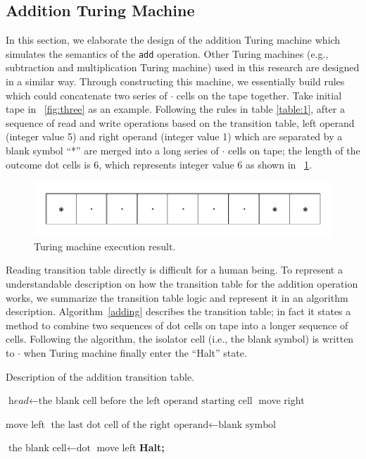\subsection{Addition Turing Machine}
In this section, we elaborate the design of the addition Turing machine which
simulates the semantics of the \texttt{add} operation. Other Turing machines
(e.g., subtraction and multiplication Turing machine) used in this research are
designed in a similar way. Through constructing this machine, we essentially
build rules which could concatenate two series of  $\cdot$ cells on the tape
together. Take initial tape in \F~\ref{fig:three} as an example. Following the
rules in table \ref{table:1}, after a sequence of read and write operations
based on the transition table, left operand (integer value 5) and right operand
(integer value 1) which are separated by a blank symbol ``*'' are merged into a
long series of $\cdot$ cells on tape; the length of the outcome dot cells is 6,
which represents integer value 6 as shown in \F~\ref{fig:turing_outcome}.

\begin{figure}
 \includegraphics[width=0.9\linewidth]{Turingaddoutcome.pdf}
 \caption{Turing machine execution result.}
 \label{fig:turing_outcome}
\end{figure}

Reading transition table directly is difficult for a human being. To represent a
understandable description on how the transition table for the addition
operation works, we summarize the transition table logic and represent it in an
algorithm description. Algorithm~\ref{adding} describes the transition table; in
fact it states a method to combine two sequences of dot cells on tape into a
longer sequence of cells. Following the algorithm, the isolator cell (i.e., the
blank symbol) is written to $\cdot$ when Turing machine finally enter the ``Halt'' state.

\begin{algorithm}
\caption{Description of the addition transition table.}
\label{adding}
\begin{algorithmic}[1]
\Procedure{}{}
\State $\textit{head} \gets \text{the blank cell before the left operand starting cell}$
 move right\;
\EndWhile

\State move left
\State $\text{the last dot cell of the right operand} \gets \text{blank symbol}$

\EndWhile
\State $\text{the blank cell} \gets \text{dot}$
  move left\;
\EndWhile
\State \textbf{Halt;}
\EndProcedure
\end{algorithmic}
\end{algorithm}

